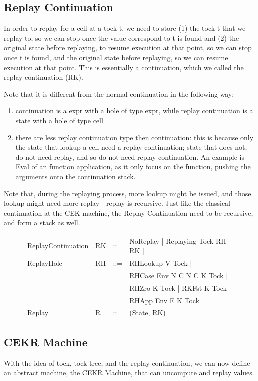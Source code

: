 \subsection{Replay Continuation}
In order to replay for a cell at a tock t, we need to store (1) the tock t that we replay to, so we can stop once the value correspond to t is found and (2) the original state before replaying, to resume execution at that point, so we can stop once t is found, and the original state before replaying, so we can resume execution at that point. 
This is essentially a continuation, which we called the replay continuation (RK).

Note that it is different from the normal continuation in the following way:
\begin{enumerate}
	\item continuation is a expr with a hole of type expr, while replay continuation is a state with a hole of type cell
	\item there are less replay continuation type then continuation: this is because only the state that lookup a cell need a replay continuation; state that does not, do not need replay, and so do not need replay continuation. An example is Eval of an function application, as it only focus on the function, pushing the arguments onto the continuation stack. 
\end{enumerate}

Note that, during the replaying process, more lookup might be issued, and those lookup might need more replay - replay is recursive. Just like the classical continuation at the CEK machine, the Replay Continuation need to be recursive, and form a stack as well.
\begin{figure}
	\begin{tabular}{p{10em} p{2.6em} p{1em} p{}}
		ReplayContinuation & RK & ::= & NoReplay | Replaying Tock RH RK | \\
		ReplayHole & RH & ::= & RHLookup V Tock | \\
		& & & RHCase Env N C N C K Tock | \\
		& & & RHZro K Tock | RKFst K Tock | \\
		& & & RHApp Env E K Tock \\
		Replay & R & ::= & (State, RK) \\
	\end{tabular}
\end{figure}

\subsection{CEKR Machine}
With the idea of tock, tock tree, and the replay continuation, we can now define an abstract machine, the CEKR Machine, that can uncompute and replay values.

